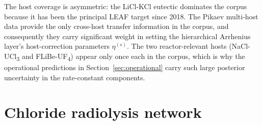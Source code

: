 \documentclass[11pt]{article}
\theoremstyle{plain}
\theoremstyle{definition}
\theoremstyle{remark}
\begin{document}
\begin{table}[h!]
\centering
\caption{Salt host melts in the corpus.}
\label{tab:hosts}
\small
{}
\end{table}

The host coverage is asymmetric: the LiCl-KCl eutectic dominates the corpus
because it has been the principal LEAF target since 2018.  The Pikaev
multi-host data provide the only cross-host transfer information in the
corpus, and consequently they carry significant weight in setting the
hierarchical Arrhenius layer's host-correction parameters $\eta^{(s)}$.  The
two reactor-relevant hosts (NaCl-UCl\textsubscript{3} and
FLiBe-UF\textsubscript{4}) appear only once each in the corpus, which is
why the operational predictions in Section~\ref{sec:operational} carry such
large posterior uncertainty in the rate-constant components.

\section{Chloride radiolysis network}\label{sec:chloride}
\end{document}
